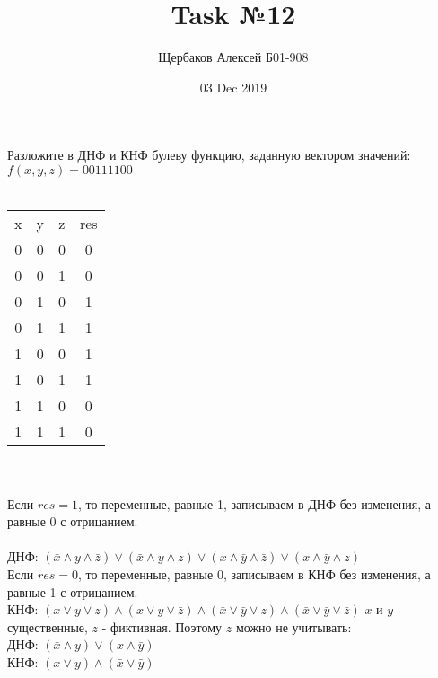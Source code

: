 \documentclass{article}
\title{Task №12}
\author{Щербаков Алексей Б01-908}
\date{03 Dec 2019}
\begin{document}
\maketitle
\section{}
Разложите в ДНФ и КНФ булеву функцию, заданную вектором значений: $f(x,y,z)=00111100$\\\\
\begin{tabular}{ |c|c|c|c| } 
 \hline
 x & y & z & res \\
 0 & 0 & 0 & 0 \\ 
 0 & 0 & 1 & 0 \\ 
 0 & 1 & 0 & 1 \\ 
 0 & 1 & 1 & 1 \\
 1 & 0 & 0 & 1 \\ 
 1 & 0 & 1 & 1 \\
 1 & 1 & 0 & 0 \\ 
 1 & 1 & 1 & 0 \\ 
 \hline
\end{tabular}\\\\
Если $res = 1$, то переменные, равные 1, записываем в ДНФ без изменения, а равные 0 с отрицанием.\\
\\ДНФ: $(\bar x\wedge y\wedge \bar z)\vee (\bar x\wedge y\wedge z) \vee (x\wedge \bar y\wedge \bar z) \vee (x\wedge\bar  y\wedge z)$\\
Если $res = 0$, то переменные, равные 0, записываем в КНФ без изменения, а равные 1 с отрицанием.\\
КНФ: $(x\vee y\vee z)\wedge(x\vee y\vee \bar z)\wedge(\bar x\vee \bar y \vee z) \wedge (\bar x \vee \bar y \vee \bar z)$
$x$ и $y$ существенные, $z$ - фиктивная.
Поэтому $z$ можно не учитывать:
\\ДНФ: $(\bar x\wedge y) \vee (x\wedge \bar y)$\\
КНФ: $(x\vee y)\wedge(\bar x\vee \bar y)$
\\
\end{document}
